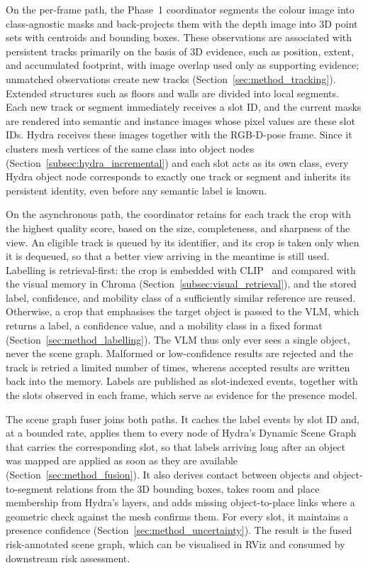 {\small On the per-frame path, the Phase~1 coordinator segments the colour image into class-agnostic masks and back-projects them with the depth image into 3D point sets with centroids and bounding boxes. These observations are associated with persistent tracks primarily on the basis of 3D evidence, such as position, extent, and accumulated footprint, with image overlap used only as supporting evidence; unmatched observations create new tracks (Section~\ref{sec:method_tracking}). Extended structures such as floors and walls are divided into local segments. Each new track or segment immediately receives a slot ID, and the current masks are rendered into semantic and instance images whose pixel values are these slot IDs. Hydra receives these images together with the RGB-D-pose frame. Since it clusters mesh vertices of the same class into object nodes (Section~\ref{subsec:hydra_incremental}) and each slot acts as its own class, every Hydra object node corresponds to exactly one track or segment and inherits its persistent identity, even before any semantic label is known.\par}

{\small On the asynchronous path, the coordinator retains for each track the crop with the highest quality score, based on the size, completeness, and sharpness of the view. An eligible track is queued by its identifier, and its crop is taken only when it is dequeued, so that a better view arriving in the meantime is still used. Labelling is retrieval-first: the crop is embedded with CLIP~\cite{radford2021clip} and compared with the visual memory in Chroma (Section~\ref{subsec:visual_retrieval}), and the stored label, confidence, and mobility class of a sufficiently similar reference are reused. Otherwise, a crop that emphasises the target object is passed to the VLM, which returns a label, a confidence value, and a mobility class in a fixed format (Section~\ref{sec:method_labelling}). The VLM thus only ever sees a single object, never the scene graph. Malformed or low-confidence results are rejected and the track is retried a limited number of times, whereas accepted results are written back into the memory. Labels are published as slot-indexed events, together with the slots observed in each frame, which serve as evidence for the presence model.\par}

{\small The scene graph fuser joins both paths. It caches the label events by slot ID and, at a bounded rate, applies them to every node of Hydra's Dynamic Scene Graph that carries the corresponding slot, so that labels arriving long after an object was mapped are applied as soon as they are available (Section~\ref{sec:method_fusion}). It also derives contact between objects and object-to-segment relations from the 3D bounding boxes, takes room and place membership from Hydra's layers, and adds missing object-to-place links where a geometric check against the mesh confirms them. For every slot, it maintains a presence confidence (Section~\ref{sec:method_uncertainty}). The result is the fused risk-annotated scene graph, which can be visualised in RViz and consumed by downstream risk assessment.\par}

